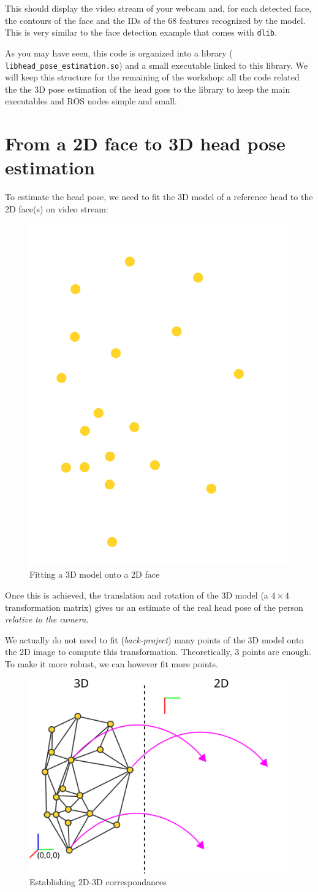 \documentclass{instructions}
\begin{document}
This should display the video stream of your webcam and, for each detected face,
the contours of the face and the IDs of the 68 features recognized by the model.
This is very similar to the face detection example that comes with {\tt dlib}.

As you may have seen, this code is organized into a library ({\tt
libhead\_pose\_estimation.so}) and a small executable linked to this library.
We will keep this structure for the remaining of the workshop: all the code
related the the 3D pose estimation of the head goes to the library to keep the main
executables and ROS nodes simple and small.

\part{From a 2D face to 3D head pose estimation}

To estimate the head pose, we need to fit the 3D model of a reference head to the
2D face(s) on video stream:

\begin{figure}[h!]
    \centering
    \includegraphics[width=0.3\linewidth]{figs/face-3d}
    \caption{Fitting a 3D model onto a 2D face}
    \label{}
\end{figure}

Once this is achieved, the translation and rotation of the 3D model (a
$4\times4$ transformation matrix) gives us an estimate of the real head pose of
the person \emph{relative to the camera}.

We actually do not need to fit (\emph{back-project}) many points of the 3D model
onto the 2D image to compute this transformation. Theoretically, 3 points are
enough. To make it more robust, we can however fit more points.

\begin{figure}[h!]
    \centering
    \includegraphics[width=0.6\linewidth]{figs/2d-3d}
    \caption{Establishing 2D-3D correspondances}
    \label{2d-3d}
\end{figure}
\end{document}
